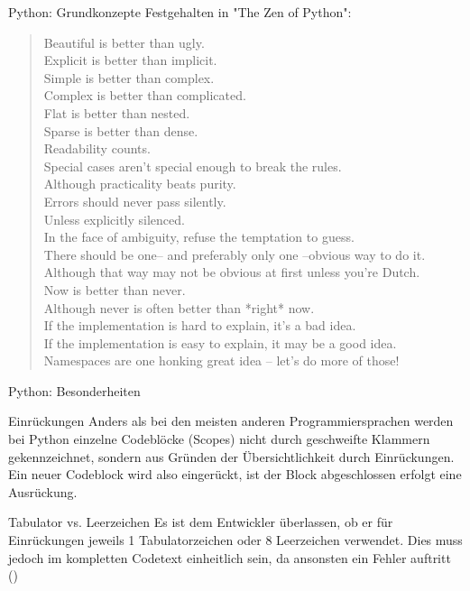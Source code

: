     \begin{frame}{Python: Grundkonzepte}
        Festgehalten in "The Zen of Python":
        
        \begin{quote}
            Beautiful is better than ugly.\\
            Explicit is better than implicit.   \\
            Simple is better than complex.\\
            Complex is better than complicated.\\
            Flat is better than nested.\\
            Sparse is better than dense.\\
            Readability counts.\\
            Special cases aren't special enough to break the rules.\\
            Although practicality beats purity.\\
            Errors should never pass silently.\\
            Unless explicitly silenced.\\
            In the face of ambiguity, refuse the temptation to guess.\\
            There should be one-- and preferably only one --obvious way to do it.\\
            Although that way may not be obvious at first unless you're Dutch.\\
            Now is better than never.\\
            Although never is often better than *right* now.\\
            If the implementation is hard to explain, it's a bad idea.\\
            If the implementation is easy to explain, it may be a good idea.\\
            Namespaces are one honking great idea -- let's do more of those!\\
        \end{quote}
    \end{frame}
    
    \begin{frame}{Python: Besonderheiten}
        \begin{alertblock}{Einrückungen}
        Anders als bei den meisten anderen Programmiersprachen werden bei Python einzelne Codeblöcke (Scopes) nicht durch geschweifte Klammern gekennzeichnet, sondern aus Gründen der Übersichtlichkeit durch Einrückungen. Ein neuer Codeblock wird also eingerückt, ist der Block abgeschlossen erfolgt eine Ausrückung.
        \end{alertblock}
        
        \begin{alertblock}{Tabulator vs. Leerzeichen}
        Es ist dem Entwickler überlassen, ob er für Einrückungen jeweils 1 Tabulatorzeichen oder 8 Leerzeichen verwendet. Dies muss jedoch im kompletten Codetext einheitlich sein, da ansonsten ein Fehler auftritt ()
        \end{alertblock}
    \end{frame}
    
